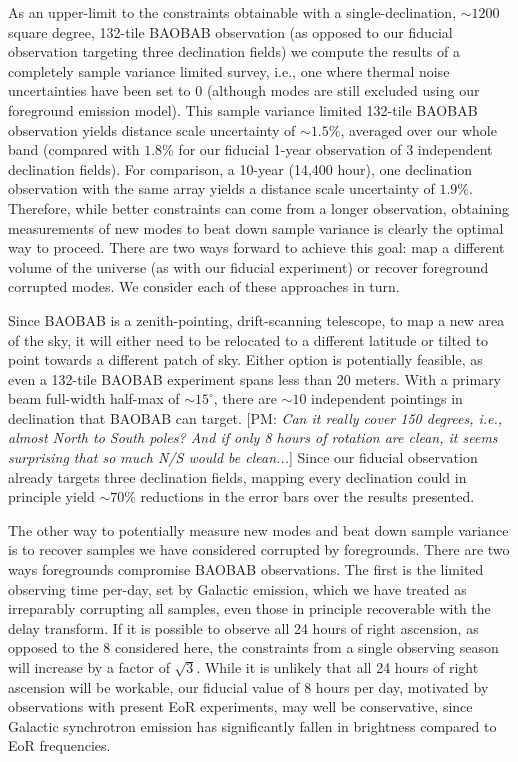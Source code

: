 \documentclass[10pt,iop]{emulateapj}
\def\pvm#1{[PM: {\it #1}] }
\begin{document}
As an upper-limit to the constraints obtainable with a single-declination, $\sim1200$ square degree, 
132-tile BAOBAB observation (as opposed to our fiducial observation targeting three declination 
fields)
we compute the results of a completely sample variance limited survey, i.e., one where thermal noise
uncertainties have been set to 0 (although modes are still excluded using our foreground
emission model).   
This sample variance
limited 132-tile BAOBAB observation yields distance scale uncertainty of $\sim1.5\%$, averaged over our whole band (compared with $1.8\%$ for our
fiducial 1-year observation of 3 independent declination fields).  
For comparison, a 10-year (14,400 hour), one declination observation with the same
array yields a distance scale uncertainty of $1.9\%$.
Therefore, while better constraints can come from a longer observation, obtaining measurements of 
new modes to beat down sample variance is clearly the optimal way to proceed.  There are two ways
forward to achieve this goal: map a different volume of the universe (as with our fiducial 
experiment) or recover foreground corrupted modes.  We consider each of these approaches in turn.

Since BAOBAB is a zenith-pointing, drift-scanning telescope, to map a new area of the sky, it will
either need to be relocated to a different latitude or tilted to point towards a different patch of sky.  Either option
is potentially feasible, as even a 132-tile BAOBAB experiment spans less than 20 meters.  With
a primary beam full-width half-max of $\sim 15^{\circ}$, there are $\sim10$ 
independent pointings
in declination that BAOBAB can target.  
\pvm{Can it really cover 150 degrees, i.e., almost North to South poles? And
if only 8 hours of rotation are clean, it seems surprising that so much N/S 
would be clean...}
Since our fiducial observation already targets three
declination fields, mapping every declination could in principle yield 
$\sim70\%$ reductions
in the error bars over the results presented. 

The other way to potentially measure new modes and beat down sample variance is to recover samples
we have considered corrupted by foregrounds.  There are two ways foregrounds 
compromise BAOBAB
observations.  The first is the limited observing time per-day, set by Galactic emission,
which we have treated as irreparably corrupting all samples, even those in principle
recoverable with the delay transform.  If it is possible to observe all 24 hours of right ascension,
as opposed to the 8 considered here, the constraints from a single observing season will increase
by a factor of $\sqrt3$.  While it is unlikely that all 24 hours of right ascension
will be workable, our fiducial value of 8 hours per day, motivated by observations
with present EoR experiments, may well
be conservative, since Galactic synchrotron emission has significantly fallen in brightness
compared to EoR frequencies.
\end{document}
